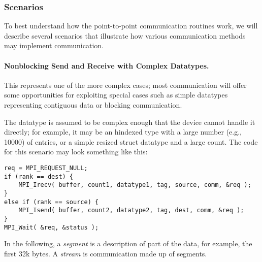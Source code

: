 \subsubsection{Scenarios}
\label{sec:pt-2-pt-scenarios}

To best understand how the point-to-point communication routines work, we will
describe several scenarios that illustrate how various communication methods
may implement communication.

\paragraph{Nonblocking Send and Receive with Complex Datatypes.}
This represents one of the more complex cases; most communication will offer
some opportunities for exploiting special cases such as simple datatypes
representing contiguous data or blocking communication.  

The datatype is assumed to be complex enough that the device cannot handle it
directly; for example, it may be an hindexed type with a large number (e.g.,
10000) of entries, or a simple resized struct datatype and a large count.
The code for this scenario may look something like this:
\begin{verbatim}
req = MPI_REQUEST_NULL;
if (rank == dest) {
    MPI_Irecv( buffer, count1, datatype1, tag, source, comm, &req );
}
else if (rank == source) {
    MPI_Isend( buffer, count2, datatype2, tag, dest, comm, &req );
}
MPI_Wait( &req, &status );
\end{verbatim}

In the following, a \emph{segment} is a description of part of the data, for
example, the first 32k bytes.  A \emph{stream} is communication made up of
segments.

